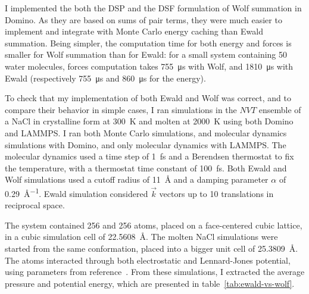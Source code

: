 \documentclass[thesis]{subfiles}
\begin{document}
I implemented the both the DSP and the DSF formulation of Wolf summation in
Domino. As they are based on sums of pair terms, they were much easier to
implement and integrate with Monte Carlo energy caching than Ewald summation.
Being simpler, the computation time for both energy and forces is smaller for
Wolf summation than for Ewald: for a small system containing 50 water molecules,
forces computation takes \SI{755}{\micro s} with Wolf, and \SI{1810}{\micro s}
with Ewald (respectively \SI{755}{\micro s} and \SI{860}{\micro s} for the
energy).

To check that my implementation of both Ewald and Wolf was correct, and to
compare their behavior in simple cases, I ran simulations in the $NVT$ ensemble
of a NaCl in crystalline form at \SI{300}{K} and molten at \SI{2000}{K} using
both Domino and LAMMPS. I ran both Monte Carlo simulations, and molecular
dynamics simulations with Domino, and only molecular dynamics with LAMMPS. The
molecular dynamics used a time step of \SI{1}{fs} and a Berendsen thermostat to
fix the temperature, with a thermostat time constant of \SI{100}{fs}. Both Ewald
and Wolf simulations used a cutoff radius of \SI{11}{\AA} and a damping
parameter $\alpha$ of \SI{0.29}{\AA^{-1}}. Ewald simulation considered $\vec k$
vectors up to 10 translations in reciprocal space.

The system contained 256  and 256  atoms, placed on a
face-centered cubic lattice, in a cubic simulation cell of \SI{22.5608}{\AA}.
The molten NaCl simulations were started from the same conformation, placed into
a bigger unit cell of \SI{25.3809}{\AA}. The atoms interacted through both
electrostatic and Lennard-Jones potential, using parameters from
reference~\cite{Mao2012}. From these simulations, I extracted the average
pressure and potential energy, which are presented in
table~\ref{tab:ewald-vs-wolf}.
\end{document}
